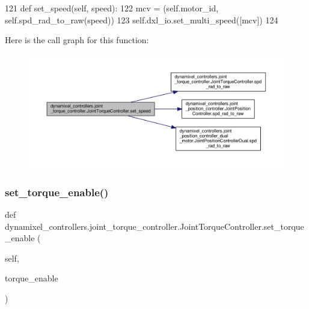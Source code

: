 \begin{DoxyCode}
121     \textcolor{keyword}{def }set\_speed(self, speed):
122         mcv = (self.motor\_id, self.spd\_rad\_to\_raw(speed))
123         self.dxl\_io.set\_multi\_speed([mcv])
124 
\end{DoxyCode}
Here is the call graph for this function\+:
\nopagebreak
\begin{figure}[H]
\begin{center}
\leavevmode
\includegraphics[width=350pt]{db/d80/classdynamixel__controllers_1_1joint__torque__controller_1_1_joint_torque_controller_a4bd0cb20fdf14a34c2dfd0eaada3d925_cgraph}
\end{center}
\end{figure}
\mbox{\label{classdynamixel__controllers_1_1joint__torque__controller_1_1_joint_torque_controller_a0921e3dc8fe7e5c5f48ea449a64b03a0}} 
\subsubsection{\texorpdfstring{set\+\_\+torque\+\_\+enable()}{set\_torque\_enable()}}
{\footnotesize\ttfamily def dynamixel\+\_\+controllers.\+joint\+\_\+torque\+\_\+controller.\+Joint\+Torque\+Controller.\+set\+\_\+torque\+\_\+enable (\begin{DoxyParamCaption}\item[{}]{self,  }\item[{}]{torque\+\_\+enable }\end{DoxyParamCaption})}



